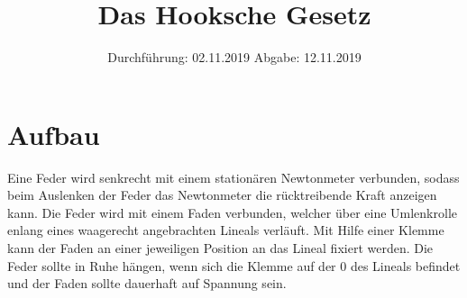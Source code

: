 

\subject{803}
\title{Das Hooksche Gesetz}
\date{%
  Durchführung: 02.11.2019
  \hspace{3em}
  Abgabe: 12.11.2019
}



\maketitle
\thispagestyle{empty}
\tableofcontents
\newpage



    \section{Aufbau}
    \label{sec:Aufbau}

    Eine Feder wird senkrecht mit einem stationären Newtonmeter verbunden, sodass beim Auslenken
    der Feder das Newtonmeter die rücktreibende Kraft anzeigen kann. Die Feder wird mit einem 
    Faden verbunden, welcher über eine Umlenkrolle enlang eines waagerecht angebrachten Lineals verläuft.
    Mit Hilfe einer Klemme kann der Faden an einer jeweiligen Position an das Lineal fixiert werden.
    Die Feder sollte in Ruhe hängen, wenn sich die Klemme auf der 0 des Lineals befindet und der Faden sollte 
    dauerhaft auf Spannung sein.




\printbibliography{}


